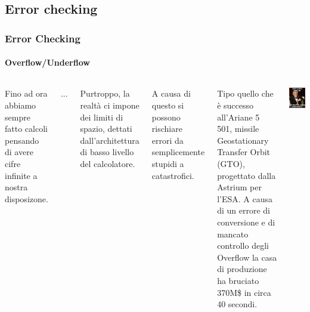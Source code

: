 \documentclass{beamer}
\begin{document}
	\subsection[Errors]{Error checking}
		\begin{frame}
	    \frametitle{Error Checking}
	    \framesubtitle{Overflow/Underflow}
	    \begin{columns}
			\footnotesize{
	    Fino ad ora abbiamo sempre fatto calcoli pensando di avere cifre infinite a nostra disposizone.
    
	    ...
	    
	    Purtroppo, la realtà ci impone dei limiti di spazio, dettati
	    dall'architettura di basso livello del calcolatore.
	    
	    A causa di questo si possono rischiare errori da semplicemente stupidi a catastrofici.
	    
	    \vspace{1em}
	    \pause
	    
	    Tipo quello che è successo all'Ariane 5 501, missile Geostationary Transfer Orbit (GTO), progettato
	    dalla Astrium per l'ESA. A causa di un errore di conversione e di mancato controllo degli Overflow
	    la casa di produzione ha bruciato 370M\$ in circa 40 secondi.
	    }
	    \begin{center}
	    		\includegraphics[width=.9\textwidth]{IMGs/overflow.jpeg}
	    \end{center}
	    \end{columns}
	  \end{frame}
	  
\end{document}
